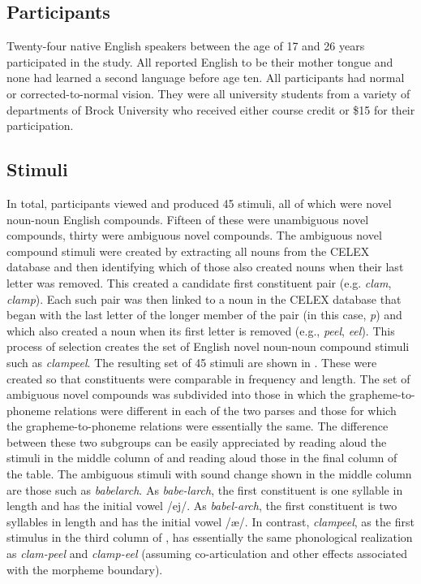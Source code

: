 \documentclass[output=paper]{langsci/langscibook}
\begin{document}
\subsection{Participants}\label{sec:libben:2.1}

Twenty-four native English speakers between the age of 17 and 26 years participated in the study.  All reported English to be their mother tongue and none had learned a second language before age ten.  All participants had normal or corrected-to-normal vision. They were all university students from a variety of departments of Brock University who received either course credit or \$15 for their participation.

\subsection{Stimuli}\label{sec:libben:2.2}
In total, participants viewed and produced 45 stimuli, all of which were novel  noun-noun English compounds. Fifteen of these were unambiguous novel compounds, thirty were ambiguous novel compounds. The ambiguous novel compound stimuli were created by extracting all nouns from the CELEX database \citep{BaayenGulikers1995} and then identifying which of those also created nouns when their last letter was removed. This created a candidate first constituent pair (e.g. \textit{clam}, \textit{clamp}). Each such pair was then linked to a noun in the CELEX database that began with the last letter of the longer member of the pair (in this case, \textit{p}) and which also created a noun when its first letter is removed (e.g., \textit{peel}, \textit{eel}). This process of selection creates the set of English novel noun-noun compound stimuli such as \textit{clampeel}.  The resulting set of 45 stimuli are shown in .  These were created so that constituents were comparable in frequency and length. The set of ambiguous novel compounds was subdivided into those in which the grapheme-to-phoneme relations were different in each of the two parses and those for which the grapheme-to-phoneme relations were essentially the same. The difference between these two subgroups can be easily appreciated by reading aloud the stimuli in the middle column of  and reading aloud those in the final column of the table. The ambiguous stimuli with sound change shown in the middle column are those such as \textit{babelarch}. As \textit{babe-larch}, the first constituent is one syllable in length and has the initial vowel /ej/. As \textit{babel-arch}, the first constituent is two syllables in length and has the initial vowel /æ/.  In contrast, \textit{clampeel}, as the first stimulus in the third column of , has essentially the same phonological realization as \textit{clam-peel} and \textit{clamp-eel} (assuming co-articulation and other effects associated with the morpheme boundary).
\end{document}
